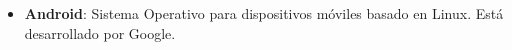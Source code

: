 \begin{itemize}
    \item \textbf{Android}: Sistema Operativo para dispositivos móviles basado en Linux. Está desarrollado por Google.
\end{itemize}